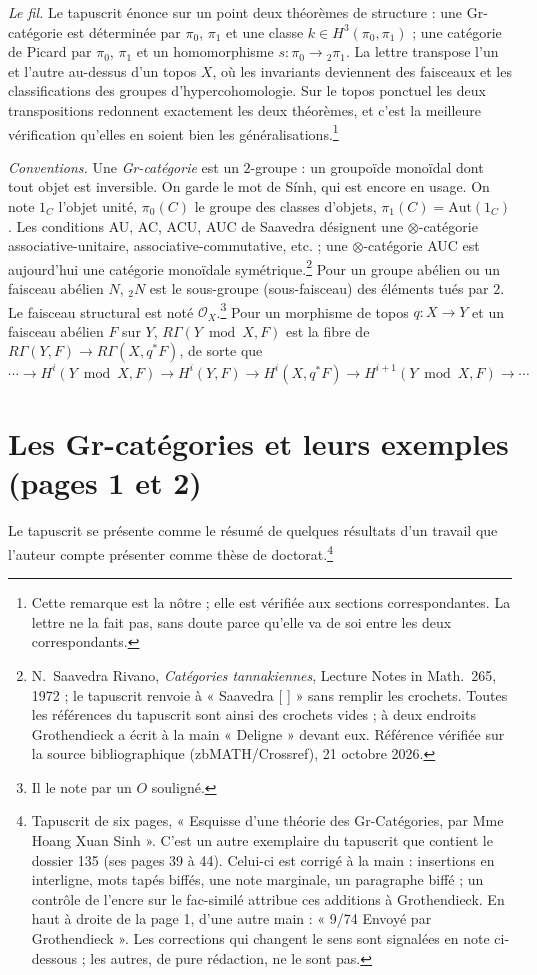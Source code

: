 \documentclass[11pt,a4paper]{article}
\begin{document}
\emph{Le fil.} Le tapuscrit énonce sur un point deux théorèmes de structure :
une Gr-catégorie est déterminée par $\pi_0$, $\pi_1$ et une classe
$k \in H^3(\pi_0, \pi_1)$ ; une catégorie de Picard par $\pi_0$, $\pi_1$ et un
homomorphisme $s : \pi_0 \to {}_2\pi_1$. La lettre transpose l'un et l'autre
au-dessus d'un topos $X$, où les invariants deviennent des faisceaux et les
classifications des groupes d'hypercohomologie. Sur le topos ponctuel les deux
transpositions redonnent exactement les deux théorèmes, et c'est la meilleure
vérification qu'elles en soient bien les généralisations.\footnote{Cette
remarque est la nôtre ; elle est vérifiée aux sections correspondantes. La
lettre ne la fait pas, sans doute parce qu'elle va de soi entre les deux
correspondants.}

\emph{Conventions.} Une \emph{Gr-catégorie} est un $2$-groupe : un groupoïde
monoïdal dont tout objet est inversible. On garde le mot de Sính, qui est
encore en usage. On note $1_C$ l'objet unité,
$\pi_0(C)$ le groupe des classes d'objets, $\pi_1(C) = \mathrm{Aut}(1_C)$.
Les conditions AU, AC, ACU, AUC de Saavedra désignent une
$\otimes$-catégorie associative-unitaire, associative-commutative, etc. ; une
$\otimes$-catégorie AUC est aujourd'hui une catégorie monoïdale
symétrique.\footnote{N.~Saavedra Rivano, \emph{Catégories tannakiennes},
Lecture Notes in Math.\ 265, 1972 ; le tapuscrit renvoie à « Saavedra [ ] »
sans remplir les crochets. Toutes les références du tapuscrit sont ainsi des
crochets vides ; à deux endroits Grothendieck a écrit à la main « Deligne » devant eux. Référence vérifiée sur la source bibliographique (zbMATH/Crossref), 21 octobre 2026.} Pour un groupe abélien ou un faisceau abélien $N$, ${}_2N$ est le
sous-groupe (sous-faisceau) des éléments tués par $2$. Le faisceau structural
est noté $\mathcal{O}_X$.\footnote{Il le note par un $O$ souligné.} Pour un
morphisme de topos $q : X \to Y$ et un faisceau abélien $F$ sur $Y$,
$R\Gamma(Y \bmod X, F)$ est la fibre de $R\Gamma(Y, F) \to R\Gamma(X, q^*F)$,
de sorte que
\[ \cdots \to H^{i}(Y \bmod X, F) \to H^{i}(Y, F) \to H^{i}(X, q^{*}F) \to
H^{i+1}(Y \bmod X, F) \to \cdots \]

\section*{Les Gr-catégories et leurs exemples (pages 1 et 2)}

Le tapuscrit se présente comme le résumé de quelques résultats d'un travail
que l'auteur compte présenter comme thèse de doctorat.\footnote{Tapuscrit de
six pages, « Esquisse d'une théorie des Gr-Catégories, par Mme Hoang Xuan
Sinh ». C'est un autre exemplaire du tapuscrit que contient le dossier 135
(ses pages 39 à 44). Celui-ci est corrigé à la main : insertions en
interligne, mots tapés biffés, une note marginale, un paragraphe biffé ; un
contrôle de l'encre sur le fac-similé attribue ces additions à Grothendieck.
En haut à droite de la page 1, d'une autre main : « 9/74 Envoyé par
Grothendieck ». Les corrections qui changent le sens sont signalées en note
ci-dessous ; les autres, de pure rédaction, ne le sont pas.}
\end{document}

